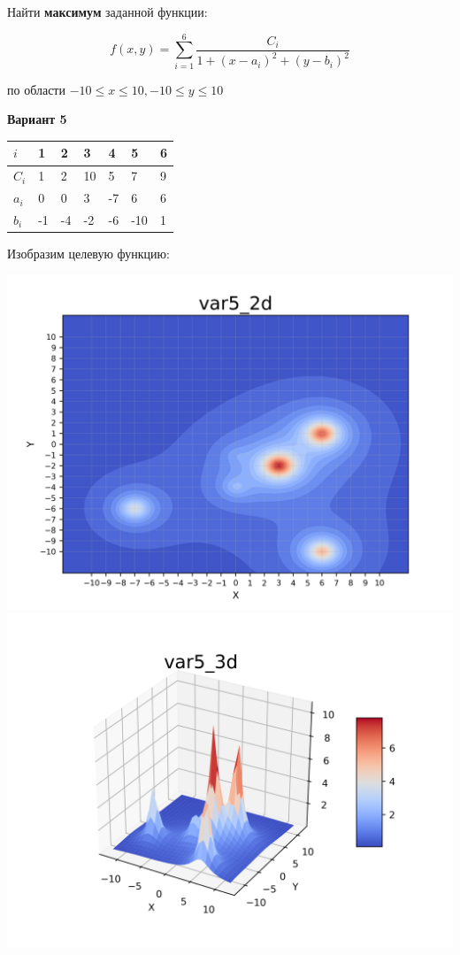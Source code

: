 \documentclass[12pt, a4paper]{article}
\begin{document}
Найти {\bf максимум} заданной функции:

\[ f(x,y)=  \sum_{i=1}^{6} \frac{C_i}{1 + (x-a_i)^2 + (y - b_i)^2}\]

по области $-10 \leq x \leq 10, -10 \leq y \leq 10$

{\bf Вариант 5}


\begin{tabular}{ | l | l | l | l | l | l | l |}
	\hline
		$i$ & 1 & 2 & 3 & 4 & 5 & 6\\ \hline
		$C_i$ & 1 & 2 & 10 & 5 & 7 & 9 \\ \hline
		$a_i$ & 0 & 0	 & 3 & -7 & 6 & 6 \\ \hline
		$b_i$ & -1 & -4 & -2 & -6 & -10 & 1 \\
	\hline
\end{tabular}

Изобразим целевую функцию:

\begin{multicols}{2}
    \hfill
    \includegraphics[width=\linewidth]{../pics/var5_2d.png}
    \hfill
    \label{figLeft}
    \hfill
    \includegraphics[width=\linewidth]{../pics/var5_3d.png}
    \label{figRight}
\end{multicols}
\end{document}
